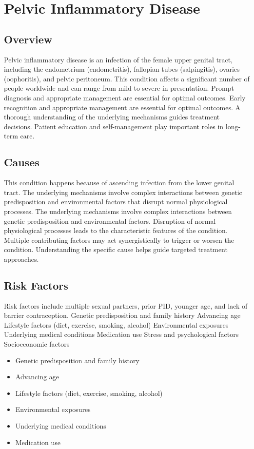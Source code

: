 \chapter{Pelvic Inflammatory Disease}
\label{sec:Pelvic Inflammatory Disease}

\section{Overview}
Pelvic inflammatory disease is an infection of the female upper genital tract, including the endometrium (endometritis), fallopian tubes (salpingitis), ovaries (oophoritis), and pelvic peritoneum. This condition affects a significant number of people worldwide and can range from mild to severe in presentation. Prompt diagnosis and appropriate management are essential for optimal outcomes. Early recognition and appropriate management are essential for optimal outcomes. A thorough understanding of the underlying mechanisms guides treatment decisions. Patient education and self-management play important roles in long-term care.
\section{Causes}
This condition happens because of ascending infection from the lower genital tract. The underlying mechanisms involve complex interactions between genetic predisposition and environmental factors that disrupt normal physiological processes. The underlying mechanisms involve complex interactions between genetic predisposition and environmental factors. Disruption of normal physiological processes leads to the characteristic features of the condition. Multiple contributing factors may act synergistically to trigger or worsen the condition. Understanding the specific cause helps guide targeted treatment approaches.
\section{Risk Factors}
Risk factors include multiple sexual partners, prior PID, younger age, and lack of barrier contraception. Genetic predisposition and family history Advancing age Lifestyle factors (diet, exercise, smoking, alcohol) Environmental exposures Underlying medical conditions Medication use Stress and psychological factors Socioeconomic factors

\begin{itemize}[noitemsep]
  \item Genetic predisposition and family history
  \item Advancing age
  \item Lifestyle factors (diet, exercise, smoking, alcohol)
  \item Environmental exposures
  \item Underlying medical conditions
  \item Medication use
\end{itemize}
